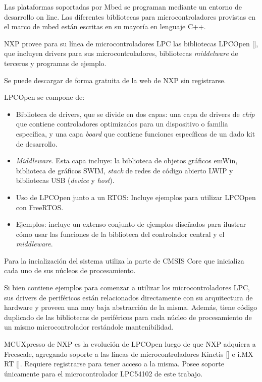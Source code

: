 Las plataformas soportadas por Mbed se programan mediante un entorno de desarrollo on line. Las diferentes bibliotecas para microcontroladores provistas en el marco de mbed están escritas en su mayoría en lenguaje C++.


NXP provee para su línea de microcontroladores LPC las bibliotecas LPCOpen [], que incluyen drivers para sus microcontroladores, bibliotecas \emph{middelware} de terceros y programas de ejemplo. 

Se puede descargar de forma gratuita de la web de NXP sin registrarse.

LPCOpen se compone de:

\begin{itemize}
\item
Biblioteca de drivers, que se divide en dos capas: una capa de drivers de \emph{chip} que contiene controladores optimizados para un dispositivo o familia específica, y una capa \emph{board} que contiene funciones específicas de un dado kit de desarrollo.
\item
\emph{Middleware}. Esta capa incluye: la biblioteca de objetos gráficos emWin, biblioteca de gráficos SWIM, \emph{stack} de redes de código abierto LWIP y bibliotecas USB (\emph{device} y \emph{host}).
\item
Uso de LPCOpen junto a un RTOS: Incluye ejemplos para utilizar LPCOpen con FreeRTOS.
\item
Ejemplos: incluye un extenso conjunto de ejemplos diseñados para ilustrar cómo usar las funciones de la biblioteca del controlador central y el \emph{middleware}.
\end{itemize}

Para la incialización del sistema utiliza la parte de CMSIS Core que inicializa cada uno de sus núcleos de procesamiento.

Si bien contiene ejemplos para comenzar a utilizar los microcontroladores LPC, sus drivers de periféricos están relacionados directamente con su arquitectura de hardware y proveen una muy baja abstracción de la misma. Además, tiene código duplicado de las bibliotecas de periféricos para cada núcleo de procesamiento de un mismo microcontrolador restándole mantenibilidad.

MCUXpresso de NXP es la evolución de LPCOpen luego de que NXP adquiera a Freescale,  agregando soporte a las líneas de microcontroladores Kinetis [] e i.MX RT []. Requiere registrarse para tener acceso a la misma. Posee soporte únicamente para el microcontrolador LPC54102 de este trabajo.

